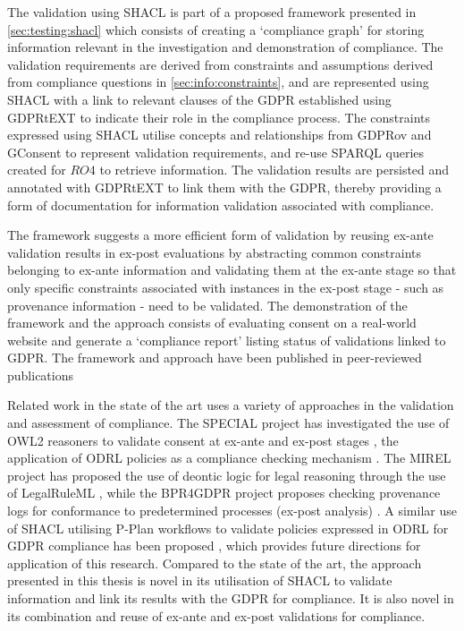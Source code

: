 The validation using SHACL is part of a proposed framework presented in \autoref{sec:testing:shacl} which consists of creating a `compliance graph' for storing information relevant in the investigation and demonstration of compliance.
The validation requirements are derived from constraints and assumptions derived from compliance questions in \autoref{sec:info:constraints}, and are represented using SHACL with a link to relevant clauses of the GDPR established using GDPRtEXT to indicate their role in the compliance process.
The constraints expressed using SHACL utilise concepts and relationships from GDPRov and GConsent to represent validation requirements, and re-use SPARQL queries created for $RO4$ to retrieve information.
The validation results are persisted and annotated with GDPRtEXT to link them with the GDPR, thereby providing a form of documentation for information validation associated with compliance.

The framework suggests a more efficient form of validation by reusing ex-ante validation results in ex-post evaluations by abstracting common constraints belonging to ex-ante information and validating them at the ex-ante stage so that only specific constraints associated with instances in the ex-post stage - such as provenance information - need to be validated.
The demonstration of the framework and the approach consists of evaluating consent on a real-world website and generate a `compliance report' listing status of validations linked to GDPR.
The framework and approach have been published in peer-reviewed publications \cite{pandit_towards_2018,pandit_exploring_2018,pandit_test-driven_2019}

Related work in the state of the art uses a variety of approaches in the validation and assessment of compliance. The SPECIAL project has investigated the use of OWL2 reasoners to validate consent at ex-ante and ex-post stages \cite{bonatti_fast_2018,dullaert_d3.4_2019}, the application of ODRL policies as a compliance checking mechanism \cite{agarwal_legislative_2018,vos_odrl_2019}. The MIREL project has proposed the use of deontic logic for legal reasoning through the use of LegalRuleML \cite{palmirani_pronto_2018,monica_modelling_2018}, while the BPR4GDPR project proposes checking provenance logs for conformance to predetermined processes (ex-post analysis) \cite{mehr_compliance_2019}.
A similar use of SHACL utilising P-Plan workflows to validate policies expressed in ODRL for GDPR compliance has been proposed \cite{lieber_policy-compliant_2019}, which provides future directions for application of this research.
Compared to the state of the art, the approach presented in this thesis is novel in its utilisation of SHACL to validate information and link its results with the GDPR for compliance. It is also novel in its combination and reuse of ex-ante and ex-post validations for compliance.

